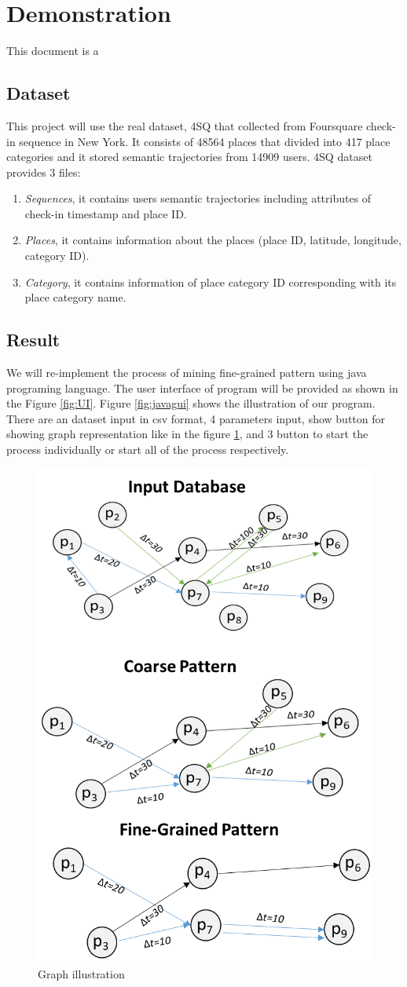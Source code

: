 \documentclass[conference]{IEEEtran}
\begin{document}
\section{Demonstration}
This document is a

\subsection{Dataset}
This project will use the real dataset, 4SQ that collected from Foursquare check-in sequence in New York. It consists of 48564 places that divided into 417 place categories and it stored semantic trajectories from 14909 users. 4SQ dataset provides 3 files:
\begin{enumerate}
\item \textit{Sequences}, it contains users semantic trajectories including attributes of check-in timestamp and place ID.
\item \textit{Places}, it contains information about the places (place ID, latitude, longitude, category ID).
\item \textit{Category}, it contains information of place category ID corresponding with its place category name.
\end{enumerate}

\subsection{Result}
We will re-implement the process of mining fine-grained pattern using java programing language. The user interface of program will be provided as shown in the Figure \ref{fig:UI}. Figure \ref{fig:javagui} shows the illustration of our program. There are an dataset input in csv format, 4 parameters input,  show button for showing graph representation like in the figure \ref{fig:graph}, and 3 button to start the process individually or start all of the process respectively. 

\begin{figure}[!ht]
\centering
\includegraphics[width=0.5\linewidth]{GraphRepresentation}
\caption{Graph illustration}
\label{fig:graph}
\end{figure}
\end{document}

